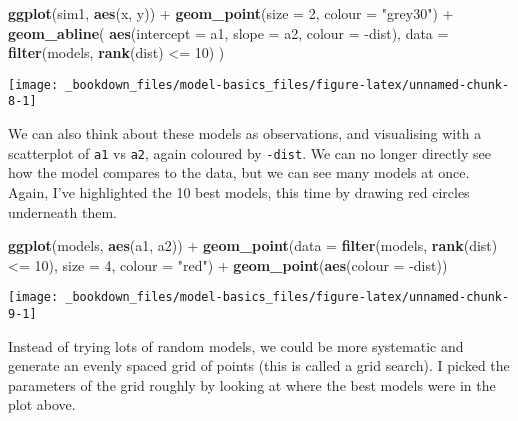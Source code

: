 \documentclass[]{book}
\newenvironment{Shaded}{\begin{snugshade}}{\end{snugshade}}
\newcommand{\KeywordTok}[1]{\textcolor[rgb]{0.13,0.29,0.53}{\textbf{{#1}}}}
\newcommand{\DataTypeTok}[1]{\textcolor[rgb]{0.13,0.29,0.53}{{#1}}}
\newcommand{\DecValTok}[1]{\textcolor[rgb]{0.00,0.00,0.81}{{#1}}}
\newcommand{\StringTok}[1]{\textcolor[rgb]{0.31,0.60,0.02}{{#1}}}
\newcommand{\NormalTok}[1]{{#1}}
\begin{document}
\begin{Shaded}
\begin{Highlighting}[]
\KeywordTok{ggplot}\NormalTok{(sim1, }\KeywordTok{aes}\NormalTok{(x, y)) +}\StringTok{ }
\StringTok{  }\KeywordTok{geom_point}\NormalTok{(}\DataTypeTok{size =} \DecValTok{2}\NormalTok{, }\DataTypeTok{colour =} \StringTok{"grey30"}\NormalTok{) +}\StringTok{ }
\StringTok{  }\KeywordTok{geom_abline}\NormalTok{(}
    \KeywordTok{aes}\NormalTok{(}\DataTypeTok{intercept =} \NormalTok{a1, }\DataTypeTok{slope =} \NormalTok{a2, }\DataTypeTok{colour =} \NormalTok{-dist), }
    \DataTypeTok{data =} \KeywordTok{filter}\NormalTok{(models, }\KeywordTok{rank}\NormalTok{(dist) <=}\StringTok{ }\DecValTok{10}\NormalTok{)}
  \NormalTok{)}
\end{Highlighting}
\end{Shaded}

\begin{center}\texttt{[image: \_bookdown\_files/model-basics\_files/figure-latex/unnamed-chunk-8-1]} \end{center}

We can also think about these models as observations, and visualising
with a scatterplot of \texttt{a1} vs \texttt{a2}, again coloured by
\texttt{-dist}. We can no longer directly see how the model compares to
the data, but we can see many models at once. Again, I've highlighted
the 10 best models, this time by drawing red circles underneath them.

\begin{Shaded}
\begin{Highlighting}[]
\KeywordTok{ggplot}\NormalTok{(models, }\KeywordTok{aes}\NormalTok{(a1, a2)) +}
\StringTok{  }\KeywordTok{geom_point}\NormalTok{(}\DataTypeTok{data =} \KeywordTok{filter}\NormalTok{(models, }\KeywordTok{rank}\NormalTok{(dist) <=}\StringTok{ }\DecValTok{10}\NormalTok{), }\DataTypeTok{size =} \DecValTok{4}\NormalTok{, }\DataTypeTok{colour =} \StringTok{"red"}\NormalTok{) +}
\StringTok{  }\KeywordTok{geom_point}\NormalTok{(}\KeywordTok{aes}\NormalTok{(}\DataTypeTok{colour =} \NormalTok{-dist))}
\end{Highlighting}
\end{Shaded}

\begin{center}\texttt{[image: \_bookdown\_files/model-basics\_files/figure-latex/unnamed-chunk-9-1]} \end{center}

Instead of trying lots of random models, we could be more systematic and
generate an evenly spaced grid of points (this is called a grid search).
I picked the parameters of the grid roughly by looking at where the best
models were in the plot above.
\end{document}
